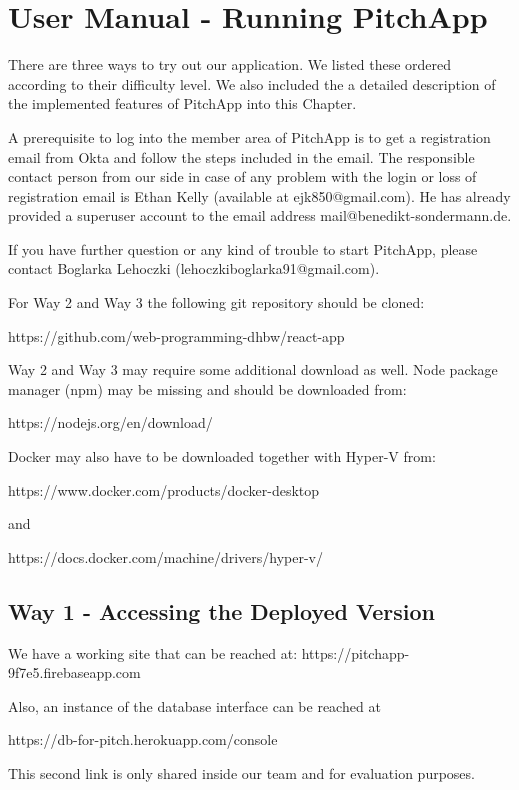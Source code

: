 \chapter{User Manual - Running PitchApp}


There are three ways to try out our application. We listed these ordered according to their difficulty level. We also included the a detailed description of the implemented features of PitchApp into this Chapter.

A prerequisite to log into the member area of PitchApp is to get a registration email from Okta and follow the steps included in the email. The responsible contact person from our side in case of any problem with the login or loss of registration email is Ethan Kelly (available at ejk850@gmail.com). He has already provided a superuser account to the email address mail@benedikt-sondermann.de.

If you have further question or any kind of trouble to start PitchApp, please contact Boglarka Lehoczki (lehoczkiboglarka91@gmail.com).

For Way 2 and Way 3 the following git repository should be cloned:

https://github.com/web-programming-dhbw/react-app

Way 2 and Way 3 may require some additional download as well.
Node package manager (npm) may be missing and should be downloaded from:

https://nodejs.org/en/download/

Docker may also have to be downloaded together with Hyper-V from:

https://www.docker.com/products/docker-desktop

and

https://docs.docker.com/machine/drivers/hyper-v/

\section{Way 1 - Accessing the Deployed Version}

We have a working site that can be reached at: https://pitchapp-9f7e5.firebaseapp.com

Also, an instance of the database interface can be reached at

https://db-for-pitch.herokuapp.com/console

This second link is only shared inside our team and for evaluation purposes.

